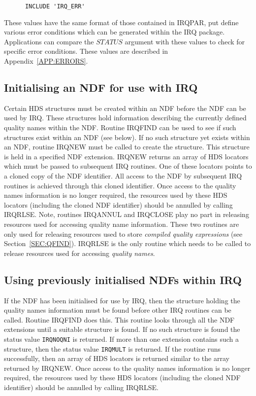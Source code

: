\documentclass[twoside,11pt]{article}
\newcommand{\htmlref}[2]{#1}
\newcommand{\latexhtml}[2]{#1}
\renewcommand{\_}{\texttt{\symbol{95}}}
\begin{document}
\begin{verbatim}
      INCLUDE 'IRQ_ERR'
\end{verbatim}

These values have the same format of those contained in IRQ\_PAR, put define
various error conditions which can be generated within the IRQ package.
Applications can compare the $STATUS$ argument with these values to check for
specific error conditions. These values are described in 
\latexhtml{Appendix~\ref {APP:ERRORS}}{\htmlref{IRQ Error
Codes}{APP:ERRORS}}. 

\subsection{Initialising an NDF for use with IRQ}

Certain HDS structures must be created within an NDF before the NDF can
be used by IRQ. These structures hold information describing the
currently defined quality names within the NDF. Routine
\htmlref{IRQ\_FIND}{IRQ_FIND} can be used to see if such structures exist
within an NDF (see below). If no such structure yet exists within an NDF,
routine \htmlref{IRQ\_NEW}{IRQ_NEW} must be called to create the
structure. This structure is held in a specified NDF extension. IRQ\_NEW
returns an array of HDS locators which must be passed to subsequent IRQ
routines. One of these locators points to a cloned copy of the NDF
identifier. All access to the NDF by subsequent IRQ routines is achieved
through this cloned identifier. Once access to the quality names
information is no longer required, the resources used by these HDS
locators (including the cloned NDF identifier) should be annulled by
calling IRQ\_RLSE. Note, routines \htmlref{IRQ\_ANNUL}{IRQ_ANNUL} and 
\htmlref{IRQ\_CLOSE}{IRQ_CLOSE} play no part in releasing resources used
for accessing quality name information. These two routines are only used
for releasing resources used to store {\em compiled quality expressions}
(see \latexhtml{Section~\ref {SEC:QFIND}}{\htmlref{ a description 
here}{SEC:QFIND}}). IRQ\_RLSE is the only routine which needs
to be called to release resources used for accessing {\em quality names}.


\subsection{Using previously initialised NDFs within IRQ}

If the NDF has been initialised for use by IRQ, then the structure
holding the quality names information must be found before other IRQ
routines can be called. Routine \htmlref{IRQ\_FIND}{IRQ_FIND} does this.
This routine looks through all the NDF extensions until a suitable
structure is found. If no such structure is found the status value
{\tt IRQ\_\_NOQNI} is returned. If more than one extension contains such a
structure, then the status value {\tt IRQ\_\_MULT} is returned. If the routine
runs successfully, then an array of HDS locators is returned similar to
the array returned by IRQ\_NEW. Once access to the quality names
information is no longer required, the resources used by these HDS
locators (including the cloned NDF identifier) should be annulled by
calling \htmlref{IRQ\_RLSE}{IRQ_RLSE}. 
\end{document}
